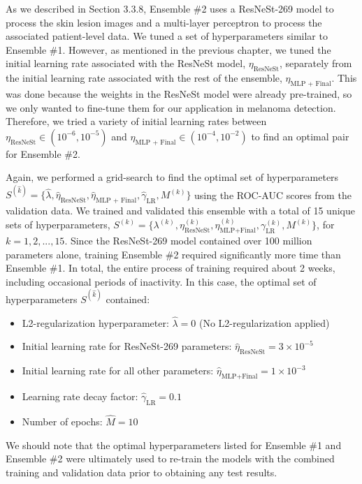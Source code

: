 \documentclass [MAS] {uclathes}
\begin{document}
As we described in Section 3.3.8, Ensemble \#2 uses a ResNeSt-269 model to process the skin lesion images and a multi-layer perceptron to process the associated patient-level data. We tuned a set of hyperparameters similar to Ensemble \#1. However, as mentioned in the previous chapter, we tuned the initial learning rate associated with the ResNeSt model, $\eta_{\text{ResNeSt}}$, separately from the initial learning rate associated with the rest of the ensemble, $\eta_{\text{MLP + Final}}$. This was done because the weights in the ResNeSt model were already pre-trained, so we only wanted to fine-tune them for our application in melanoma detection. Therefore, we tried a variety of initial learning rates between $\eta_{\text{ResNeSt}} \in (10^{-6}, 10^{-5})$ and $\eta_{\text{MLP + Final}} \in (10^{-4}, 10^{-2})$ to find an optimal pair for Ensemble \#2.

Again, we performed a grid-search to find the optimal set of hyperparameters $S^{(\hat k)} = \{\hat \lambda, \hat \eta_{\text{ResNeSt}}, \hat \eta_{\text{MLP + Final}}, \hat \gamma_{\text{LR}}, M^{(k)}\}$ using the ROC-AUC scores from the validation data. We trained and validated this ensemble with a total of 15 unique sets of hyperparameters, $S^{(k)} = \{\lambda^{(k)}, \eta_{\text{ResNeSt}}^{(k)}, \eta_{\text{MLP+Final}}^{(k)}, \gamma_{\text{LR}}^{(k)}, M^{(k)}\}$, for $k=1, 2, ..., 15$. Since the ResNeSt-269 model contained over 100 million parameters alone, training Ensemble \#2 required significantly more time than Ensemble \#1. In total, the entire process of training required about 2 weeks, including occasional periods of inactivity. In this case, the optimal set of hyperparameters $S^{(\hat k)}$ contained:

\begin{itemize}
    \item L2-regularization hyperparameter: $\hat \lambda = 0$ (No L2-regularization applied)
    \item Initial learning rate for ResNeSt-269 parameters: $\hat \eta_{\text{ResNeSt}} = 3 \times 10^{-5}$
    \item Initial learning rate for all other parameters: $\hat \eta_{\text{MLP+Final}} = 1 \times 10^{-3}$
    \item Learning rate decay factor: $\hat \gamma_{\text{LR}} = 0.1$
    \item Number of epochs: $\hat M=10$
\end{itemize}

We should note that the optimal hyperparameters listed for Ensemble \#1 and Ensemble \#2 were ultimately used to re-train the models with the combined training and validation data prior to obtaining any test results.
\end{document}
